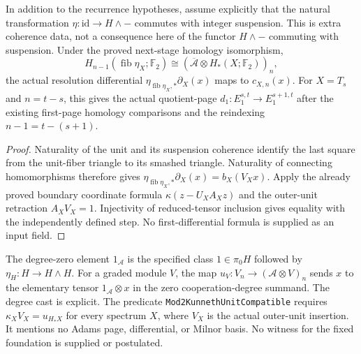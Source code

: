 \begin{proposition}
  \label{prop:h6-first-differential-cobar-step}
  \leanok
  In addition to the recurrence hypotheses, assume explicitly that the
  natural transformation $\eta:\mathrm{id}\to H\wedge-$ commutes with
  integer suspension. This is extra coherence data, not a consequence
  here of the functor $H\wedge-$ commuting with suspension.
  Under the proved next-stage homology isomorphism,
  \[
    H_{n-1}(\operatorname{fib}\eta_X;\mathbb F_2)
       \cong(\overline{\mathcal A}\otimes H_*(X;\mathbb F_2))_n,
  \]
  the actual resolution differential $\eta_{\operatorname{fib}\eta_X,*}
  \partial_X(x)$ maps to $c_{X,n}(x)$.
  For $X=T_s$ and $n=t-s$, this gives the actual quotient-page
  $d_1:E_1^{s,t}\to E_1^{s+1,t}$ after the existing first-page
  homology comparisons and the reindexing $n-1=t-(s+1)$.
\end{proposition}
\begin{proof}
  Naturality of the unit and its suspension coherence identify the last
  square from the unit-fiber triangle to its smashed triangle.
  Naturality of connecting homomorphisms therefore gives
  $\eta_{\operatorname{fib}\eta_X,*}\partial_X(x)=b_X(V_Xx)$.
  Apply the already proved boundary coordinate formula
  $\kappa(z-U_XA_Xz)$ and the outer-unit retraction $A_XV_X=1$.
  Injectivity of reduced-tensor inclusion gives equality with the
  independently defined step. No first-differential formula is supplied
  as an input field.
  \leanok
\end{proof}

\begin{definition}
  \label{def:h6-kunneth-unit-input}
  \leanok
  The degree-zero element $1_{\mathcal A}$ is the specified class
  $1\in\pi_0H$ followed by $\eta_H:H\to H\wedge H$.
  For a graded module $V$, the map $u_V:V_n\to(\mathcal A\otimes V)_n$
  sends $x$ to the elementary tensor $1_{\mathcal A}\otimes x$ in the
  zero cooperation-degree summand. The degree cast is explicit.
  The predicate \texttt{Mod2KunnethUnitCompatible} requires
  $\kappa_X V_X=u_{H_*X}$ for every spectrum $X$, where $V_X$ is the actual
  outer-unit insertion. It mentions no Adams page, differential, or Milnor
  basis. No witness for the fixed foundation is supplied or postulated.
\end{definition}

